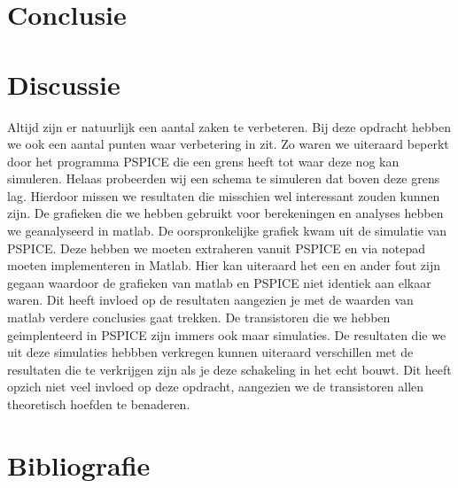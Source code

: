 \documentclass{scrartcl}  %
\begin{document}
\section{Conclusie}


\section{Discussie}
Altijd zijn er natuurlijk een aantal zaken te verbeteren. Bij deze opdracht hebben we ook een aantal punten waar verbetering in zit. Zo waren we uiteraard beperkt door het programma PSPICE die een grens heeft tot waar deze nog kan simuleren. Helaas probeerden wij een schema te simuleren dat boven deze grens lag. Hierdoor missen we resultaten die misschien wel interessant zouden kunnen zijn. 
De grafieken die we hebben gebruikt voor berekeningen en analyses hebben we geanalyseerd in matlab. De oorspronkelijke grafiek kwam uit de simulatie van PSPICE. Deze hebben we moeten extraheren vanuit PSPICE en via notepad moeten implementeren in Matlab. Hier kan uiteraard het een en ander fout zijn gegaan waardoor de grafieken van matlab en PSPICE niet identiek aan elkaar waren. Dit heeft invloed op de resultaten aangezien je met de waarden van matlab verdere conclusies gaat trekken. 
De transistoren die we hebben geimplenteerd in PSPICE zijn immers ook maar simulaties. De resultaten die we uit deze simulaties hebbben verkregen kunnen uiteraard verschillen met de resultaten die te verkrijgen zijn als je deze schakeling in het echt bouwt. Dit heeft opzich niet veel invloed op deze opdracht, aangezien we de transistoren allen theoretisch hoefden te benaderen. 

\newpage
\section{Bibliografie}
\printbibliography
\end{document}

